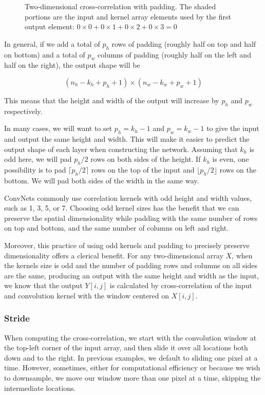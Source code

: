 \begin{figure}[hpt]
	\centering
	
	\caption{Two-dimensional cross-correlation with padding. The shaded portions are the input and kernel array elements used by the first output element: $0\times0+0\times1+0\times2+0\times3=0$}
	\label{fig:conv_pad}
\end{figure}

In general, if we add a total of  $p_h$  rows of padding (roughly half on top and half on bottom) and a total of  $p_w$  columns of padding (roughly half on the left and half on the right), the output shape will be

$$(n_h-k_h+p_h+1)\times(n_w-k_w+p_w+1)$$
 
This means that the height and width of the output will increase by  $p_h$  and  $p_w$  respectively.

In many cases, we will want to set  $p_h=k_h-1$  and  $p_w=k_w-1$  to give the input and output the same height and width. This will make it easier to predict the output shape of each layer when constructing the network. Assuming that  $k_h$  is odd here, we will pad  $p_h/2$ rows on both sides of the height. If $k_h$  is even, one possibility is to pad  $\lceil p_h/2\rceil$  rows on the top of the input and  $\lfloor p_h/2\rfloor$  rows on the bottom. We will pad both sides of the width in the same way.

ConvNets commonly use correlation kernels with odd height and width values, such as 1, 3, 5, or 7. Choosing odd kernel sizes has the benefit that we can preserve the spatial dimensionality while padding with the same number of rows on top and bottom, and the same number of columns on left and right.

Moreover, this practice of using odd kernels and padding to precisely preserve dimensionality offers a clerical benefit. For any two-dimensional array $X$, when the kernels size is odd and the number of padding rows and columns on all sides are the same, producing an output with the same height and width as the input, we know that the output $Y[i,j]$ is calculated by cross-correlation of the input and convolution kernel with the window centered on $X[i,j]$.

\subsubsection{Stride}

When computing the cross-correlation, we start with the convolution window at the top-left corner of the input array, and then slide it over all locations both down and to the right. In previous examples, we default to sliding one pixel at a time. However, sometimes, either for computational efficiency or because we wish to downsample, we move our window more than one pixel at a time, skipping the intermediate locations.


